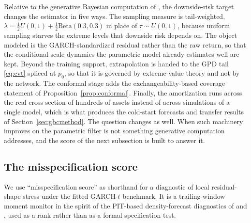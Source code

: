 \documentclass[11pt]{article}
\theoremstyle{remark}
\begin{document}
Relative to the generative Bayesian computation of
\citet{polson2023gbc}, the downside-risk target changes the estimator in five ways. The sampling measure is tail-weighted, $\lambda = \tfrac12 U(0,1) + \tfrac12 \mathrm{Beta}(0.3,0.3)$ in place of $\tau\sim U(0,1)$, because uniform sampling starves the extreme levels that downside risk depends on. The object modeled is the GARCH-standardized residual rather than the raw return, so that the conditional-scale dynamics the parametric model already estimates well are kept. Beyond the training support, extrapolation is handed to the GPD tail \eqref{eq:evt} spliced at $p_0$, so that it is governed by extreme-value theory and not by the network. The conformal stage adds the exchangeability-based coverage statement of Proposition~\ref{prop:conformal}. Finally, the amortization runs across the real cross-section of hundreds of assets instead of across simulations of a single model, which is what produces the cold-start forecasts and transfer results of Section~\ref{sec:gbcmethod}. The question changes as well. When such machinery improves on the parametric filter is not something generative computation addresses, and the score of the next subsection is built to answer it.

\subsection{The misspecification score}\label{sec:score}

We use ``misspecification score'' as shorthand for a diagnostic of local
residual-shape stress under the fitted GARCH-$t$ benchmark. It is a trailing-window moment monitor in the spirit of the PIT-based density-forecast diagnostics of \citet{dieboldgunthertay1998} and \citet{berkowitz2001}, used as a rank rather than as a formal specification test.
\end{document}
